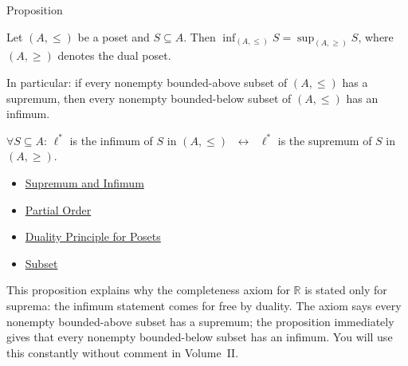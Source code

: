 
\begin{propositionbox}{Proposition}
\begin{proposition}
\label{prop:sup-inf-duality}
Let $(A, \leq)$ be a poset and $S \subseteq A$.  Then
$\inf_{(A,\leq)} S = \sup_{(A,\geq)} S$,
where $(A,\geq)$ denotes the dual poset.

In particular: if every nonempty bounded-above subset of $(A,\leq)$ has a
supremum, then every nonempty bounded-below subset of $(A,\leq)$ has an
infimum.
\end{proposition}
\end{propositionbox}

\begin{remark*}
$\forall S \subseteq A$: $\ell^*$ is the infimum of $S$ in $(A,\leq)$
$\;\leftrightarrow\;$ $\ell^*$ is the supremum of $S$ in $(A,\geq)$.
\end{remark*}

\begin{dependencies}
\begin{itemize}
  \item \hyperref[def:sup-inf]{Supremum and Infimum}
  \item \hyperref[def:partial-order]{Partial Order}
  \item \hyperref[prop:order-duality]{Duality Principle for Posets}
  \item \hyperref[def:subset]{Subset}
\end{itemize}
\end{dependencies}

\begin{remark*}
\label{rem:inf-from-completeness}
This proposition explains why the completeness axiom for $\mathbb{R}$ is
stated only for suprema: the infimum statement comes for free by duality.
The axiom says every nonempty bounded-above subset has a supremum; the
proposition immediately gives that every nonempty bounded-below subset has
an infimum.  You will use this constantly without comment in Volume~II.
\end{remark*}


